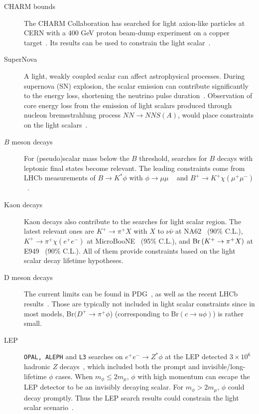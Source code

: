 \documentclass[letterpaper,11pt]{article}
\begin{document}
\begin{description}
   
    
    \item [CHARM bounds] The CHARM Collaboration has searched for light axion-like particles at CERN with a 400 GeV proton beam-dump experiment on a copper target~\cite{CHARM:1985anb}. Its results can be used to constrain the light scalar~\cite{Winkler:2018qyg,Gorbunov:2021ccu}.
    \item [SuperNova] 
    A light, weakly coupled scalar can affect astrophysical processes. During supernova (SN) explosion, the scalar emission can  contribute significantly to the energy loss, shortening the neutrino pulse duration~\cite{Turner:1987by}.  Observation of core energy loss from the emission of light scalars produced through nucleon bremsstrahlung process  $N N \to N N S(A)$, would place constraints on the light scalars~\cite{Ellis:1987pk,Krnjaic:2015mbs,Batell:2019nwo}.   
    \item [$B$ meson decays] For (pseudo)scalar mass below the $B$ threshold, searches for  $B$ decays with leptonic final states become relevant. The leading constraints come from LHCb measurements of  $B \to K^* \phi $ with $\phi \to \mu\mu$ ~\cite{LHCb:2015nkv} and $B^{+} \rightarrow K^{+} \chi\left(\mu^{+} \mu^{-}\right)$~\cite{LHCb:2016awg}.  
    \item [Kaon  decays]  Kaon decays also contribute to the searches for light scalar region. The latest relevant ones are $K^{+} \rightarrow \pi^{+} X$ with $X$  to $\nu\bar\nu$ at   NA62~\cite{NA62:2021zjw} (90\% C.L.), $K^{+} \rightarrow \pi^{+} \chi\left(e^{+} e^{-}\right)$ at MicroBooNE~\cite{MicroBooNE:2021usw} (95\% C.L.), and ${\rm Br}\left(K^{+} \rightarrow \pi^{+} X\right)$ at E949~\cite{BNL-E949:2009dza} (90\% C.L.). All of them provide constraints based on the light scalar decay lifetime hypotheses.   
    \item [D meson decays] The current limits can be found in PDG~\cite{ParticleDataGroup:2022pth}, as well as the recent LHCb results~\cite{Aaij:2020wyk}. Those are typically not included in light scalar constraints since in most models, Br$(D^+ \to \pi^+ \phi$) (corresponding to Br$(c \to u \phi)$) is rather small.  
   \item [LEP]   {\tt OPAL, ALEPH} and {\tt L3} searches on $e^+e^- \to Z^* \phi$ at the LEP   detected $ 3 \times 10^6$ hadronic $Z$ decays~\cite{L3:1996ome,ALEPH:1993sjl,OPAL:2007qwz}, which included both the prompt and  invisible/long-lifetime $\phi$ cases. When $m_{\phi} \le 2m_\mu$, $\phi$ with high momentum can escape the LEP detector to be an invisibly decaying scalar. For $m_{\phi} > 2m_\mu$, $\phi$ could decay promptly. Thus the LEP search results could constrain the light scalar scenario~\cite{Winkler:2018qyg,Clarke:2013aya}.  
\end{description}
\end{document}
